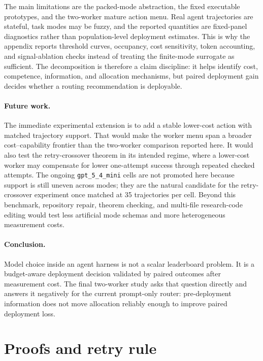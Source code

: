 \documentclass{article}
\begin{document}
The main limitations are the packed-mode abstraction, the fixed executable prototypes, and the two-worker mature action menu.
Real agent trajectories are stateful, task modes may be fuzzy, and the reported quantities are fixed-panel diagnostics rather than population-level deployment estimates.
This is why the appendix reports threshold curves, occupancy, cost sensitivity, token accounting, and signal-ablation checks instead of treating the finite-mode surrogate as sufficient.
The decomposition is therefore a claim discipline: it helps identify cost, competence, information, and allocation mechanisms, but paired deployment gain decides whether a routing recommendation is deployable.

\paragraph{Future work.}
The immediate experimental extension is to add a stable lower-cost action with matched trajectory support.
That would make the worker menu span a broader cost--capability frontier than the two-worker comparison reported here.
It would also test the retry-crossover theorem in its intended regime, where a lower-cost worker may compensate for lower one-attempt success through repeated checked attempts.
The ongoing \texttt{gpt\_5\_4\_mini} cells are not promoted here because support is still uneven across modes; they are the natural candidate for the retry-crossover experiment once matched at 35 trajectories per cell.
Beyond this benchmark, repository repair, theorem checking, and multi-file research-code editing would test less artificial mode schemas and more heterogeneous measurement costs.

\paragraph{Conclusion.}
Model choice inside an agent harness is not a scalar leaderboard problem.
It is a budget-aware deployment decision validated by paired outcomes after measurement cost.
The final two-worker study asks that question directly and answers it negatively for the current prompt-only router: pre-deployment information does not move allocation reliably enough to improve paired deployment loss.




\appendix

\section{Proofs and retry rule}
\label{app:proofs}
\end{document}
